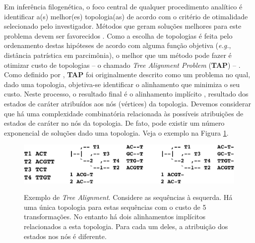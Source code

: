 \begin{refsection}
Em inferência filogenética, o foco central de qualquer procedimento analítico é identificar a(s) melhor(es) topologia(as) de acordo com o critério de otimalidade selecionado pelo investigador. Métodos que geram soluções melhores para este problema devem ser favorecidos \parencite[][]{Wheeler_and_Giribet_2009}. Como a escolha de topologias é feita pelo ordenamento destas hipóteses de acordo com alguma função objetiva (\textit{e.g.}, distância patrística em parcimônia), o melhor que um método pode fazer é otimizar custo de topologias -- o chamado \textit{Tree Alignment Problem} (\textbf{TAP}) -- \parencite[][]{Sankoff_1975}. Como definido por \textcite[][:133]{Wheeler_2012}, \textbf{TAP} foi originalmente descrito como um problema no qual, dado uma topologia, objetiva-se identificar o alinhamento que minimiza o seu custo. Neste processo, o resultado final é o alinhamento implícito \parencite[senso ][]{Wheeler_2003a}, resultado dos estados de caráter atribuídos aos nós (vértices) da topologia. Devemos considerar que há uma complexidade combinatória relacionada às possíveis atribuições de estados de caráter no nós da topologia. De fato, pode existir um número exponencial de soluções dado uma topologia. Veja o exemplo na Figura \ref{tut9:fig:tap}. 

 
  \begin{figure}[H]
       \centering
      {\includegraphics[scale=0.9]{figures/tut9/tap.eps}}
	{\caption[Exemplo de \textit{Tree Alignment}]{Exemplo de \textit{Tree Alignment}. Considere as sequências à esquerda. Há uma única topologia para estas sequências com o custo de 5 transformações. No entanto há dois alinhamentos implícitos relacionados a esta topologia. Para cada um deles, a atribuição dos estados nos nós é diferente.}\label{tut9:fig:tap}}
  \end{figure}



\end{refsection}
